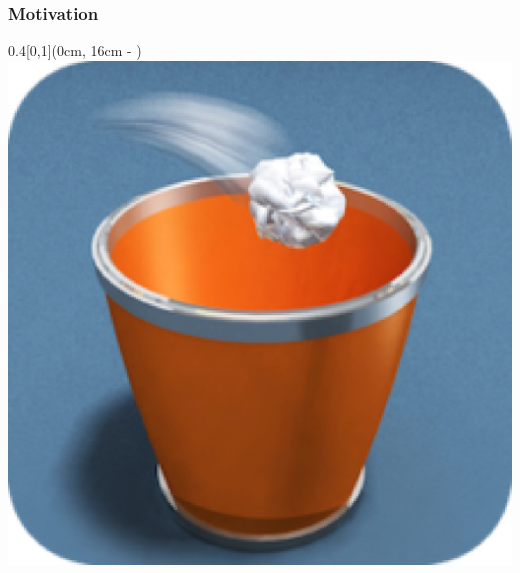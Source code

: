 \PraesentationMasterKopfzeileDreizeiler

\PraesentationTitelseite









\begin{frame}
	\frametitle{Motivation}	
	\vspace{1cm}
	
	\begin{textblock*}{0.4\paperwidth}[0,1](0cm, 16cm - \PraesentationSeitenrand)%
		\includegraphics[width=0.4\paperwidth]{./Ressourcen/Figures/paper_toss_app.pdf}
	\end{textblock*}
	

\end{frame}
